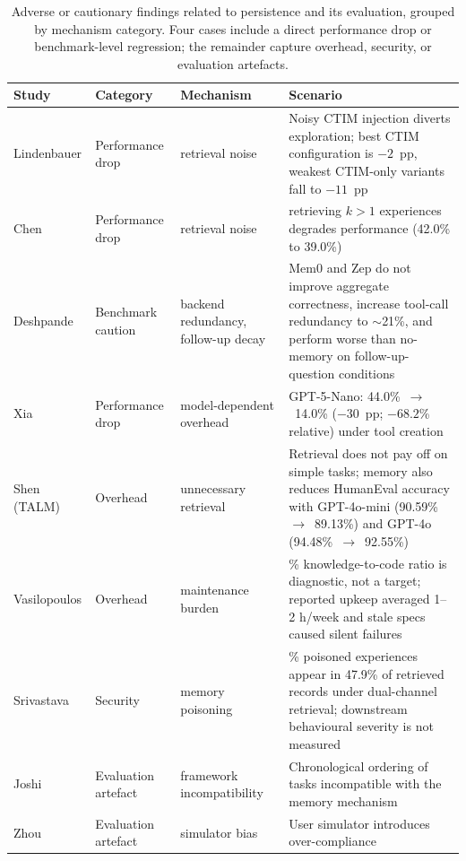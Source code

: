 \begin{table}[htbp]
  \centering
  \caption{Adverse or cautionary findings related to persistence and
    its evaluation, grouped by mechanism category.
    Four cases include a direct performance drop or benchmark-level
    regression; the remainder capture overhead, security, or evaluation
    artefacts.}
  \label{tab:degradation}
  \small
  \setlength{\tabcolsep}{5pt}
  \begin{tabularx}{\textwidth}{@{} >{\raggedright\arraybackslash}p{2.0cm} >{\raggedright\arraybackslash}p{2.4cm} >{\raggedright\arraybackslash}p{2.9cm} >{\raggedright\arraybackslash}X @{}}
    \toprule
    Study & Category & Mechanism & Scenario \\
    \midrule
    Lindenbauer & Performance drop & retrieval noise &
      Noisy CTIM injection diverts exploration;
      best CTIM configuration is $-2$~pp, weakest CTIM-only variants
      fall to $-11$~pp \\
    Chen & Performance drop & retrieval noise &
      retrieving $k > 1$ experiences degrades performance
      (42.0\% to 39.0\%) \\
    Deshpande & Benchmark caution & backend redundancy, follow-up decay &
      Mem0 and Zep do not improve aggregate correctness, increase
      tool-call redundancy to $\sim$21\%, and perform worse than no-memory
      on follow-up-question conditions \\
    Xia & Performance drop & model-dependent overhead &
      GPT-5-Nano: 44.0\%~$\to$~14.0\% ($-30$~pp;
      $-68.2$\% relative) under tool creation \\
    \midrule
    Shen (TALM) & Overhead & unnecessary retrieval &
      Retrieval does not pay off on simple tasks;
      memory also reduces HumanEval accuracy with GPT-4o-mini
      (90.59\%~$\to$~89.13\%) and GPT-4o (94.48\%~$\to$~92.55\%) \\
    Vasilopoulos & Overhead & maintenance burden &
      24.2\% knowledge-to-code ratio is diagnostic, not a target;
      reported upkeep averaged 1--2 h/week and stale specs caused
      silent failures \\
    \midrule
    Srivastava & Security & memory poisoning &
      9.1\% poisoned experiences appear in 47.9\% of retrieved records
      under dual-channel retrieval; downstream behavioural severity is
      not measured \\
    \midrule
    Joshi & Evaluation artefact & framework incompatibility &
      Chronological ordering of tasks incompatible with the memory
      mechanism \\
    Zhou & Evaluation artefact & simulator bias &
      User simulator introduces over-compliance \\
    \bottomrule
  \end{tabularx}
\end{table}

